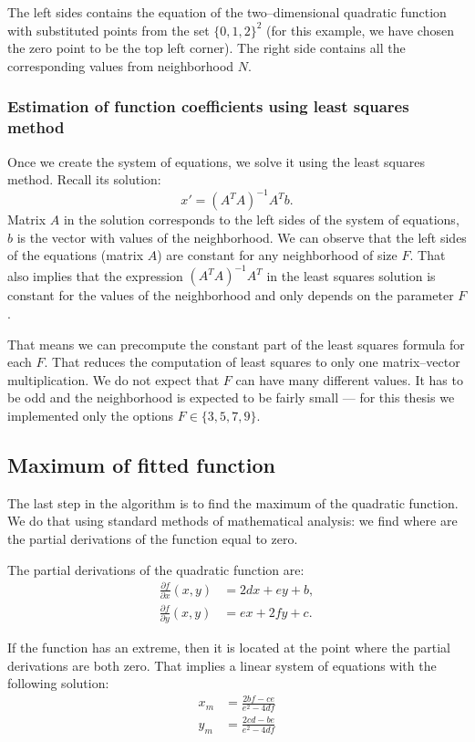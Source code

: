 The left sides contains the equation of the two--dimensional quadratic function with substituted points from the set $\{0,1,2\}^2$ (for this example, we have chosen the zero point to be the top left corner). The right side contains all the corresponding values from neighborhood $N$.

\subsubsection{Estimation of function coefficients using least squares method}
\label{estimation}

Once we create the system of equations, we solve it using the least squares method. Recall its solution:
\[
x' = (A^TA)^{-1}A^Tb.
\]
Matrix $A$ in the solution corresponds to the left sides of the system of equations, $b$ is the vector with values of the neighborhood. We can observe that the left sides of the equations (matrix $A$) are constant for any neighborhood of size $F$. That also implies that the expression $(A^TA)^{-1}A^T$ in the least squares solution is constant for the values of the neighborhood and only depends on the parameter $F$.

That means we can precompute the constant part of the least squares formula for each $F$. That reduces the computation of least squares to only one matrix--vector multiplication. We do not expect that $F$ can have many different values. It has to be odd and the neighborhood is expected to be fairly small --- for this thesis we implemented only the options $F \in \{3, 5, 7, 9\}$.


\subsection{Maximum of fitted function}
\label{max-fitted}
The last step in the algorithm is to find the maximum of the quadratic function. We do that using standard methods of mathematical analysis: we find where are the partial derivations of the function equal to zero.

The partial derivations of the quadratic function are:
\begin{align*}
\frac{\partial f}{\partial x}(x,y) &= 2dx + ey + b,\\
\frac{\partial f}{\partial y}(x,y) &= ex + 2fy + c.
\end{align*}

If the function has an extreme, then it is located at the point where the partial derivations are both zero. That implies a linear system of equations with the following solution:
\begin{align*}
x_m &= \frac{2bf - ce}{e^2 - 4df}\\
y_m &= \frac{2cd - be}{e^2 - 4df}
\end{align*}


